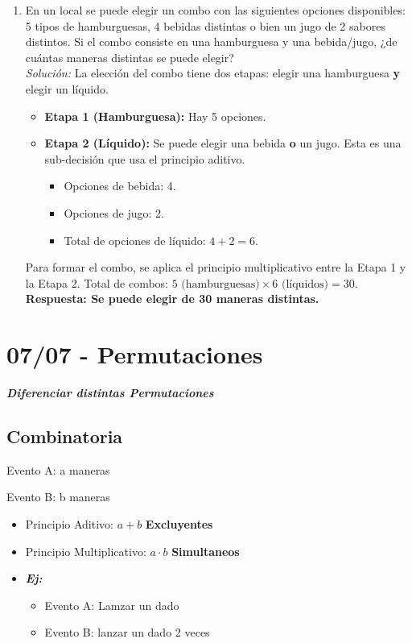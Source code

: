 \documentclass[12pt, letterpaper]{article}
\begin{document}
\begin{enumerate}
	\item En un local se puede elegir un combo con las siguientes opciones disponibles: 5 tipos de hamburguesas, 4 bebidas distintas o bien un jugo de 2 sabores distintos. Si el combo consiste en una hamburguesa y una bebida/jugo, ¿de cuántas maneras distintas se puede elegir? \\
	      \textit{Solución:}
	      La elección del combo tiene dos etapas: elegir una hamburguesa \textbf{y} elegir un líquido.
	      \begin{itemize}
		      \item \textbf{Etapa 1 (Hamburguesa):} Hay 5 opciones.
		      \item \textbf{Etapa 2 (Líquido):} Se puede elegir una bebida \textbf{o} un jugo. Esta es una sub-decisión que usa el principio aditivo.
		            \begin{itemize}
			            \item Opciones de bebida: 4.
			            \item Opciones de jugo: 2.
			            \item Total de opciones de líquido: $4 + 2 = 6$.
		            \end{itemize}
	      \end{itemize}
	      Para formar el combo, se aplica el principio multiplicativo entre la Etapa 1 y la Etapa 2.
	      Total de combos: $5 \text{ (hamburguesas)} \times 6 \text{ (líquidos)} = 30$. \\
	      \textbf{Respuesta: Se puede elegir de 30 maneras distintas.}
\end{enumerate}
\newpage


\section{07/07 - Permutaciones}
\textbf{\textit{\large{Diferenciar distintas Permutaciones}}}

\subsection{Combinatoria}
Evento A: a maneras

Evento B: b maneras

\begin{itemize}
	\item Principio Aditivo: $a + b$ \textbf{Excluyentes}
	\item Principio Multiplicativo: $a \cdot b$ \textbf{Simultaneos}
	\item \textbf{\textit{Ej:}}
	      \begin{itemize}
		      \item Evento A: Lamzar un dado
		      \item Evento B: lanzar un dado 2 veces
	      \end{itemize}
\end{itemize}
\end{document}
